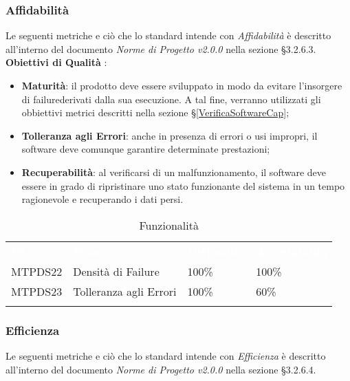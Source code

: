 \subsubsection{Affidabilità}

Le seguenti metriche e ciò che lo standard intende con \textit{Affidabilità} è descritto all'interno del documento \textit{Norme di Progetto v2.0.0} nella sezione §3.2.6.3. \\
\textbf{Obiettivi di Qualità} :

\begin{itemize}
	\item \textbf{Maturità}: il prodotto deve essere sviluppato in modo da evitare l'insorgere di failure\glossario derivati dalla sua esecuzione. A tal fine, verranno utilizzati gli obbiettivi metrici descritti nella sezione §\ref{VerificaSoftwareCap};
	\item \textbf{Tolleranza agli Errori}: anche in presenza di errori o usi impropri, il software deve comunque garantire determinate prestazioni;
	\item \textbf{Recuperabilità}: al verificarsi di un malfunzionamento, il software deve essere in grado di ripristinare uno stato funzionante del sistema in un tempo ragionevole e recuperando i dati persi.
\end{itemize}

\begin{longtable}{|C{.15\textwidth}|C{.24\textwidth}|C{.24\textwidth}|C{.24\textwidth}|}
\hline
{}\textbf{\textcolor{white}{ID}} & \textbf{\textcolor{white}{Nome}} & \textbf{\textcolor{white}{Ottimalità}} & \textbf{\textcolor{white}{Accettabilità}}\\
MTPDS22 & Densità di Failure & 100\% & 100\%\\
\hline
{}MTPDS23 & Tolleranza agli Errori & 100\% & 60\% \\ 
\hline
\caption{Funzionalità}
\label{Funzionalità}
\end{longtable}



\subsubsection{Efficienza}

Le seguenti metriche e ciò che lo standard intende con \textit{Efficienza} è descritto all'interno del documento \textit{Norme di Progetto v2.0.0} nella sezione §3.2.6.4. \\

